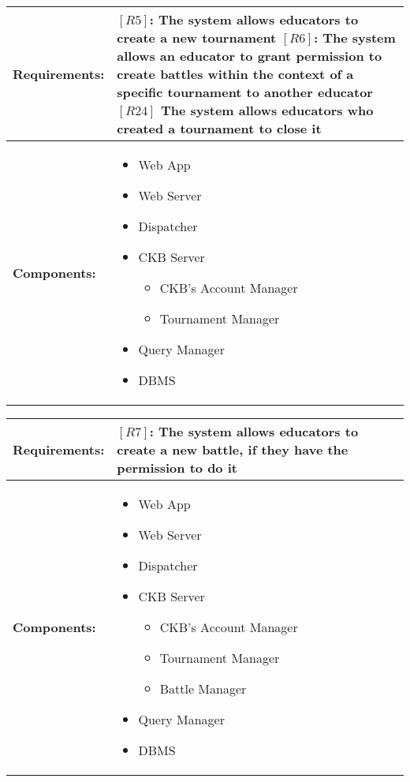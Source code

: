 \begin{table}[H]
  \centering
  \begin{tabularx}{\textwidth}{|p{3cm}|X|}
    \hline
    \textbf{Requirements:} &
    $[R5]$: The system allows educators to create a new tournament
    \newline$[R6]$: The system allows an educator to grant permission to create battles within the context of a specific tournament to another educator
    \newline$[R24]$ The system allows educators who created a tournament to close it
    \\
    \hline
    \textbf{Components:} & 
    \begin{itemize}
        \item Web App
        \item Web Server 
        \item Dispatcher
        \item CKB Server 
        \begin{itemize}
            \item CKB's Account Manager
            \item Tournament Manager 
        \end{itemize}
        \item Query Manager
        \item DBMS
    \end{itemize}
    \\
    \hline
  \end{tabularx}
\end{table}


\begin{table}[H]
  \centering
  \begin{tabularx}{\textwidth}{|p{3cm}|X|}
    \hline
    \textbf{Requirements:} &
    $[R7]$: The system allows educators to create a new battle, if they have the permission to do it
    \\
    \hline
    \textbf{Components:} & 
    \begin{itemize}
        \item Web App
        \item Web Server 
        \item Dispatcher 
        \item CKB Server 
        \begin{itemize}
            \item CKB's Account Manager
            \item Tournament Manager
            \item Battle Manager 
        \end{itemize}
        \item Query Manager
        \item DBMS
    \end{itemize}
    \\
    \hline
  \end{tabularx}
\end{table}


